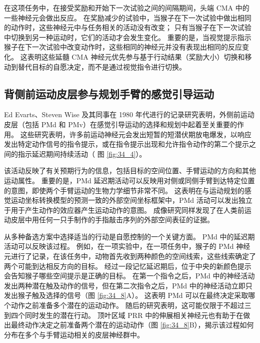 在这项任务中，在接受奖励和开始下一次试验之间的间隔期间，头端 CMA 中的一些神经元会做出反应。
在奖励减少的试验中，当猴子在下一次试验中做出相同的动作时，这些神经元中与任务相关的活动没有改变；
只有当猴子在下一次试验中切换到另一种运动时，它们的活动才会发生变化。 重要的是，当视觉提示指示猴子在下一次试验中改变动作时，这些相同的神经元并没有表现出相同的反应变化。 这表明这些延髓 CMA 神经元优先参与基于行动结果（奖励大小）切换和移动到替代目标的自愿决定，而不是通过视觉指令进行切换。


\subsection{背侧前运动皮层参与规划手臂的感觉引导运动}
Ed Evarts、Steven Wise 及其同事在 1980 年代进行的记录研究表明，外侧前运动皮层（包括 PMd 和 PMv）在感觉引导运动的选择和规划中起着至关重要的作用。 这些研究表明，许多前运动神经元会发出短暂的短潜伏期放电爆发，以响应发出特定动作信号的指令提示，或在指令提示出现和允许指令动作的第二个提示之间的指示延迟期间持续活动（ 图 \ref{fig:34_4}）。

该活动反映了有关预期行为的信息，包括目标的空间位置、手臂运动的方向和其他运动属性。 重要的是，PMd 延迟期活动可以反映用对侧或同侧手臂到达特定位置的意图，即使两个手臂运动的生物力学细节非常不同。 这表明在与运动规划的感觉运动坐标转换模型的预测一致的外部空间坐标框架中，PMd 活动可以发出独立于用于产生动作的效应器产生运动动作的意图。 成像研究同样发现了在人类前运动皮层中用任何一只手制作的手指敲击序列的外部空间表征的证据。

从多种备选方案中选择适当的行动是自愿控制的一个关键方面。 PMd 中的延迟期活动可以反映该过程。 例如，在一项实验中，在一项任务中，猴子的 PMd 神经元进行了记录，在该任务中，动物首先收到两种颜色的空间线索，这些线索确定了两个可能到达相反方向的目标。 经过一段记忆延迟期后，位于中央的新颜色提示会告知猴子哪些空间提示是正确的目标。 
在第一个指令之后，PMd 中的神经活动发出两种潜在触及动作的信号，但在第二次指令之后，PMd 中的神经活动立即只发出猴子触及选择的信号（图 \ref{fig:34_8}A）。 
这表明 PMd 可以在最终决定采取哪个动作之前准备多个潜在的运动动作。 
随后的研究表明，这可能仅限于不超过三到四个同时发生的潜在行动。 
顶叶区域 PRR 中的伸展相关神经元也有助于在做出最终动作决定之前准备两个潜在的运动动作（图 \ref{fig:34_8}B），揭示该过程如何分布在多个与手臂运动相关的皮层神经群中。

